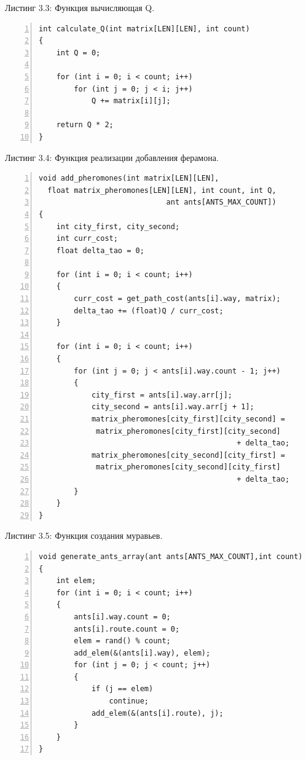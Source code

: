 \documentclass[12pt,a4paper]{report}
\begin{document}
\noindent\textrm{Листинг 3.3: Функция вычисляющая Q.}
\begin{lstlisting}[frame=single, numbers=left]
int calculate_Q(int matrix[LEN][LEN], int count)
{
    int Q = 0;
	
    for (int i = 0; i < count; i++)
        for (int j = 0; j < i; j++)
            Q += matrix[i][j];
	
    return Q * 2;
}
\end{lstlisting}


\noindent\textrm{Листинг 3.4: Функция реализации добавления ферамона.}
\begin{lstlisting}[frame=single, numbers=left]
void add_pheromones(int matrix[LEN][LEN],  
  float matrix_pheromones[LEN][LEN], int count, int Q,
                             ant ants[ANTS_MAX_COUNT])
{
    int city_first, city_second;
    int curr_cost;
    float delta_tao = 0;
 
    for (int i = 0; i < count; i++)
    {
        curr_cost = get_path_cost(ants[i].way, matrix);
        delta_tao += (float)Q / curr_cost;
    }
	
    for (int i = 0; i < count; i++)
    {
        for (int j = 0; j < ants[i].way.count - 1; j++)
        {
            city_first = ants[i].way.arr[j];
            city_second = ants[i].way.arr[j + 1];
            matrix_pheromones[city_first][city_second] =
             matrix_pheromones[city_first][city_second]
                                             + delta_tao;
            matrix_pheromones[city_second][city_first] =
             matrix_pheromones[city_second][city_first] 
                                             + delta_tao;
        }
    }
}
\end{lstlisting}




\noindent\textrm{Листинг 3.5: Функция создания муравьев.}
\begin{lstlisting}[frame=single, numbers=left]
void generate_ants_array(ant ants[ANTS_MAX_COUNT],int count)
{
    int elem; 
    for (int i = 0; i < count; i++)
    {
        ants[i].way.count = 0;
        ants[i].route.count = 0;
        elem = rand() % count;
        add_elem(&(ants[i].way), elem);
        for (int j = 0; j < count; j++)
        {
            if (j == elem)
                continue;
            add_elem(&(ants[i].route), j);
        }
    }
}
\end{lstlisting}
\end{document}
